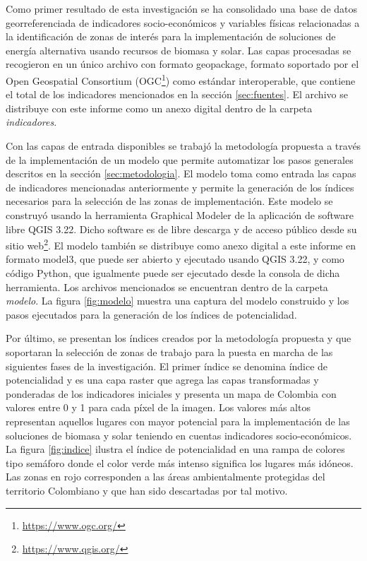 
Como primer resultado de esta investigación se ha consolidado una base de datos georreferenciada de indicadores socio-económicos y variables físicas relacionadas a la identificación
de zonas de interés para la implementación de soluciones de energía alternativa usando recursos de biomasa y solar.  Las capas procesadas se recogieron en un
único archivo con formato geopackage, formato soportado por el Open Geospatial Consortium (OGC\footnote{\url{https://www.ogc.org/}}) como estándar
interoperable, que contiene el total de los indicadores mencionados en la sección \ref{sec:fuentes}.  El archivo se distribuye con este informe como un 
anexo digital dentro de la carpeta \textit{indicadores}.

Con las capas de entrada disponibles se trabajó la metodología propuesta a través de la implementación de un modelo que permite automatizar los pasos
generales descritos en la sección \ref{sec:metodologia}.  El modelo toma como entrada las capas de indicadores mencionadas anteriormente y permite la 
generación de los índices necesarios para la selección de las zonas de implementación.  Este modelo se construyó usando la herramienta Graphical Modeler de la 
aplicación de software libre QGIS 3.22.  Dicho software es de libre descarga y de acceso público desde su sitio web\footnote{\url{https://www.qgis.org/}}.  El 
modelo también se distribuye como anexo digital a este informe en formato model3, que puede ser abierto y ejecutado usando QGIS 3.22, y como código Python, que 
igualmente puede ser ejecutado desde la consola de dicha herramienta.  Los archivos mencionados se encuentran dentro de la carpeta \textit{modelo}.  La figura 
\ref{fig:modelo} muestra una captura del modelo construido y los pasos ejecutados para la generación de los índices de potencialidad.

Por último, se presentan los índices creados por la metodología propuesta y que soportaran la selección de zonas de trabajo para la puesta en marcha de las 
siguientes fases de la investigación.  El primer índice se denomina índice de potencialidad y es una capa raster que agrega las capas transformadas y 
ponderadas de los indicadores iniciales y presenta un mapa de Colombia con valores entre 0 y 1 para cada píxel de la imagen.  Los valores más altos representan 
aquellos lugares con mayor potencial para la implementación de las soluciones de biomasa y solar teniendo en cuentas indicadores socio-económicos. 
 La figura \ref{fig:indice} ilustra el índice de potencialidad en una rampa de colores tipo semáforo donde el color verde más intenso significa los lugares más 
idóneos.  Las zonas en rojo corresponden a las áreas ambientalmente protegidas del territorio Colombiano y que han sido descartadas por tal motivo.

